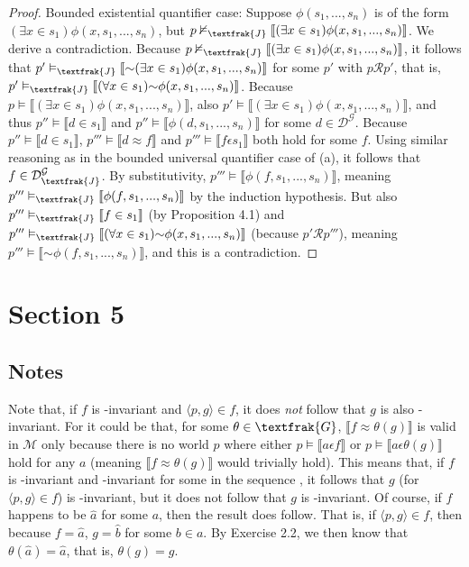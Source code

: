 \documentclass{article}
\newcommand*{\oldneg}{\mathord{\sim}}
\newcommand{\lbc}{\llbracket}
\newcommand{\rbc}{\rrbracket}
\theoremstyle{definition}
\begin{document}
\begin{proof}
Bounded existential quantifier case: Suppose $\phi(s_1,...,s_n)$ is of the form
$(\exists x\in s_1)\phi(x,s_1,...,s_n)$, but $p\nvDash_\textfrak{J}\lbc(\exists x\in s_1)\phi(x,s_1,...,s_n)\rbc$. We derive a contradiction.
Because $p\nvDash_\textfrak{J}\lbc(\exists x\in s_1)\phi(x,s_1,...,s_n)\rbc$, it follows that
$p'\vDash_\textfrak{J}\lbc\oldneg(\exists x\in s_1)\phi(x,s_1,...,s_n)\rbc$ for some $p'$ with $p\mathcal{R}p'$, that is, 
$p'\vDash_\textfrak{J}\lbc(\forall x\in s_1)\oldneg\phi(x,s_1,...,s_n)\rbc$. Because 
$p\vDash\lbc(\exists x\in s_1)\phi(x,s_1,...,s_n)\rbc$, also
$p'\vDash\lbc(\exists x\in s_1)\phi(x,s_1,...,s_n)\rbc$, and thus
$p''\vDash\lbc d\in s_1\rbc$ and $p''\vDash\lbc\phi(d,s_1,...,s_n)\rbc$ for some 
$d\in\mathcal{D}^\mathcal{G}$. Because $p''\vDash\lbc d\in s_1\rbc$, 
$p'''\vDash\lbc d\approx f\rbc$ and $p'''\vDash\lbc f\epsilon s_1\rbc$ both hold for some $f$. Using similar reasoning as in the 
bounded universal quantifier case of (a), it follows that $f\in\mathcal{D}^\mathcal{G}_\textfrak{J}$. By substitutivity,
$p'''\vDash\lbc\phi(f,s_1,...,s_n)\rbc$, meaning
$p'''\vDash_\textfrak{J}\lbc\phi(f,s_1,...,s_n)\rbc$ by the induction hypothesis. But also
$p'''\vDash_\textfrak{J}\lbc f\in s_1\rbc$ (by Proposition 4.1) and 
$p'''\vDash_\textfrak{J}\lbc(\forall x\in s_1)\oldneg\phi(x,s_1,...,s_n)\rbc$ (because
$p'\mathcal{R}p'''$), meaning $p'''\vDash\lbc\oldneg\phi(f,s_1,...,s_n)\rbc$, and this is a 
contradiction.

\end{proof}

\section*{Section 5}

\subsection*{Notes}
Note that, if $f$ is -invariant and $\langle p,g\rangle\in f$, it does \textit{not} follow that
$g$ is also -invariant. For it could be that, for some $\theta\in\textfrak{G}$, 
$\lbc f\approx\theta(g)\rbc$ is valid in $\mathcal{M}$ only because there is no world $p$ where 
either $p\vDash\lbc a\epsilon f\rbc$ or $p\vDash\lbc a\epsilon\theta(g)\rbc$ hold for any $a$ (meaning 
$\lbc f\approx\theta(g)\rbc$ would trivially hold). This means that, if $f$ is -invariant 
and -invariant for some  in the sequence , it follows that 
$g$ (for $\langle p,g\rangle\in f$) is -invariant, but it does not follow that 
$g$ is -invariant. Of course, if $f$ happens to be $\hat{a}$ for some $a$, then the result does follow. That is, 
if $\langle p,g\rangle\in f$, then because $f=\hat{a}$, $g=\hat{b}$ for some $b\in a$. By Exercise 2.2, 
we then know that $\theta(\hat{a})=\hat{a}$, that is, $\theta(g)=g$. 
\end{document}
